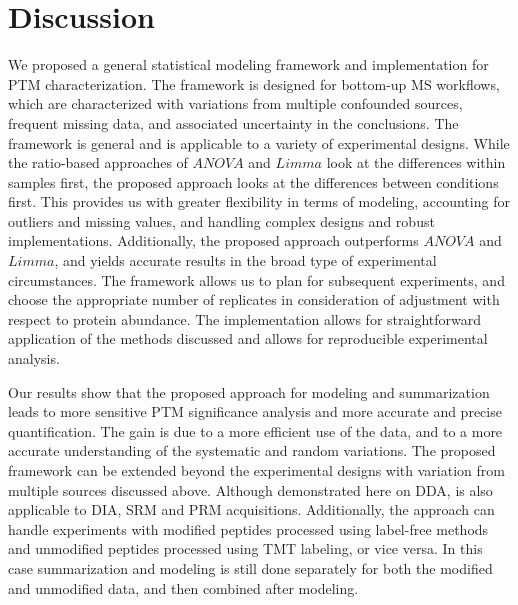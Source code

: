 \documentclass[mcp]{article}
\numberwithin{table}{section}
\begin{document}

\section{Discussion}

We proposed a general statistical modeling framework and implementation for PTM characterization. The framework is designed for bottom-up MS workflows, which are characterized with variations from multiple confounded sources, frequent missing data, and associated uncertainty in the conclusions. The framework is general and is applicable to a variety of experimental designs. While the ratio-based approaches of $ANOVA$ and $Limma$ look at the differences within samples first, the proposed approach looks at the differences between conditions first. This provides us with greater flexibility in terms of modeling, accounting for outliers and missing values, and handling complex designs and robust implementations. Additionally, the proposed approach outperforms $ANOVA$ and $Limma$, and yields accurate results in the broad type of experimental circumstances. The framework allows us to plan for subsequent experiments, and choose the appropriate number of replicates in consideration of adjustment with respect to protein abundance. The implementation allows for straightforward application of the methods discussed and allows for reproducible experimental analysis.

Our results show that the proposed approach for modeling and summarization leads to more sensitive PTM significance analysis and more accurate and precise quantification. The gain is due to a more efficient use of the data, and to a more accurate understanding of the systematic and random variations. The proposed framework can be extended beyond the experimental designs with variation from multiple sources discussed above. Although demonstrated here on DDA, is also applicable to DIA, SRM and PRM acquisitions. Additionally, the approach can handle experiments with modified peptides processed using label-free methods and unmodified peptides processed using TMT labeling, or vice versa. In this case summarization and modeling is still done separately for both the modified and unmodified data, and then combined after modeling.
\end{document}
